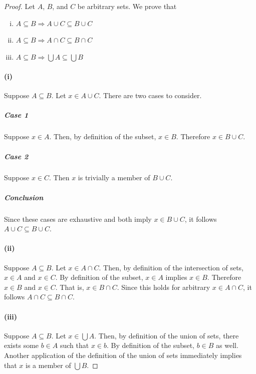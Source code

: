 \documentclass{report}
\begin{document}
\begin{proof}

  \statementpadding




  \noindent Let $A$, $B$, and $C$ be arbitrary sets.
  We prove that
    \begin{enumerate}[(i)]
      \item $A \subseteq B \Rightarrow A \cup C \subseteq B \cup C$
      \item $A \subseteq B \Rightarrow A \cap C \subseteq B \cap C$
      \item $A \subseteq B \Rightarrow \bigcup A \subseteq \bigcup B$
    \end{enumerate}

  \paragraph{(i)}%

    Suppose $A \subseteq B$.
    Let $x \in A \cup C$.
    There are two cases to consider.

    \subparagraph{Case 1}%

      Suppose $x \in A$.
      Then, by definition of the subset, $x \in B$.
      Therefore $x \in B \cup C$.

    \subparagraph{Case 2}%

      Suppose $x \in C$.
      Then $x$ is trivially a member of $B \cup C$.

    \subparagraph{Conclusion}%

      Since these cases are exhaustive and both imply $x \in B \cup C$, it
        follows $A \cup C \subseteq B \cup C$.

  \paragraph{(ii)}%

    Suppose $A \subseteq B$.
    Let $x \in A \cap C$.
    Then, by definition of the intersection of sets, $x \in A$ and $x \in C$.
    By definition of the subset, $x \in A$ implies $x \in B$.
    Therefore $x \in B$ and $x \in C$.
    That is, $x \in B \cap C$.
    Since this holds for arbitrary $x \in A \cap C$, it follows
      $A \cap C \subseteq B \cap C$.

  \paragraph{(iii)}%

    Suppose $A \subseteq B$.
    Let $x \in \bigcup A$.
    Then, by definition of the union of sets, there exists some $b \in A$ such
      that $x \in b$.
    By definition of the subset, $b \in B$ as well.
    Another application of the definition of the union of sets immediately
      implies that $x$ is a member of $\bigcup B$.

\end{proof}
\end{document}

